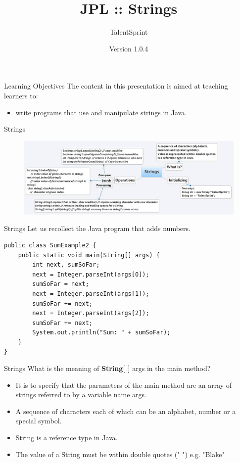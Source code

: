 \documentclass[14pt]{beamer}
\title[JPL:Java:02]{JPL :: Strings}
\author[TS]{TalentSprint}
\institute[L\&D]{Licensed To Skill}
\date{Version 1.0.4}
\begin{document}
\begin{frame}
  \titlepage
\end{frame}

\begin{frame}{Learning Objectives}
The content in this presentation is aimed at teaching  learners to:
\begin{itemize}
\item write programs that use and manipulate strings in Java.
\end{itemize}
\end{frame}

\begin{frame}{Strings}
\begin{figure}[H]
\begin{center}
\includegraphics[scale=.4]{strings.jpg}
\end{center}
\end{figure}
\end{frame}

\begin{frame}[fragile]{Strings}
Let us recollect the Java program that adds numbers.
\begin{lstlisting}[numbers=none]
public class SumExample2 {
    public static void main(String[] args) {
        int next, sumSoFar;
        next = Integer.parseInt(args[0]);
        sumSoFar = next;
        next = Integer.parseInt(args[1]);
        sumSoFar += next;
        next = Integer.parseInt(args[2]);
        sumSoFar += next;
        System.out.println("Sum: " + sumSoFar);
    }
}
\end{lstlisting}
\end{frame}

\begin{frame}{Strings}
What is the meaning of \textbf{String[ ]} args in the main method?
\begin{itemize}
\item It is to specify that the parameters of the main method are an array of strings referred to by a variable name args.
\item A sequence of characters each of which can be an alphabet, number or a special symbol.
\item String is a reference type in Java.
\item The value of a String must be within double quotes (" ") e.g.  "Blake"
\end{itemize}
\end{frame}
\end{document}
